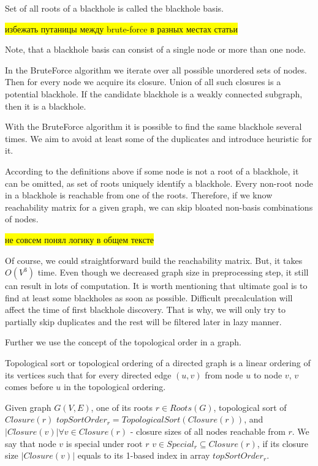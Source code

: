 \documentclass{svproc}
\newcommand{\FIXME}[1]{ %
	\colorbox{yellow}{#1}
}
\newcommand{\FIXME}[1]{ %
}
\begin{document}
\begin{definition}
Set of all roots of a blackhole is called the blackhole basis.
\end{definition}

\FIXME{избежать путаницы между brute-force в разных местах статьи}

Note, that a blackhole basis can consist of a single node or more than one node. 

In the BruteForce algorithm we iterate over all possible unordered sets of nodes. 
Then for every node we acquire its closure. Union of all such closures is a potential blackhole.
If the candidate blackhole is a weakly connected subgraph, then it is a blackhole.

With the BruteForce algorithm it is possible to find the same blackhole several times.
We aim to avoid at least some of the duplicates and introduce heuristic for it.

According to the definitions above if some node is not a root of a blackhole, it can be omitted, as set of roots uniquely identify a blackhole.
Every non-root node in a blackhole is reachable from one of the roots. Therefore, if we know reachability matrix for a given graph, we can skip bloated non-basis combinations of nodes.

\FIXME{не совсем понял логику в общем тексте}
Of course, we could straightforward build the reachability matrix. But, it takes $O(V^3)$ time. Even though we decreased graph size
in preprocessing step, it still can result in lots of computation. It is worth mentioning that ultimate goal is to find at least some blackholes as soon as possible. 
Difficult precalculation will affect the time of first blackhole discovery. That is why, we will only try to partially skip duplicates and the rest will
be filtered later in lazy manner.

Further we use the concept of the topological order in a graph.  

\begin{definition}
	Topological sort or topological ordering of a directed graph is a linear ordering of 
	its vertices such that for every directed edge $(u,v)$ from node $u$ to node $v$,
	$v$ comes before $u$ in the topological ordering.
\end{definition}

\begin{definition}
    Given graph $G(V, E)$, one of its roots $r \in Roots(G)$, topological sort of $Closure(r)$ $topSortOrder_r = TopologicalSort(Closure(r))$, and
    ${|Closure(v)| \forall v \in Closure(r)}$ - closure sizes of all nodes reachable from $r$. We say that node $v$ is special under root $r$
    $v \in Special_r \subseteq Closure(r)$, if its closure size $|Closure(v)|$ equals to its 1-based index in array $topSortOrder_r$.
\end{definition}
\end{document}
